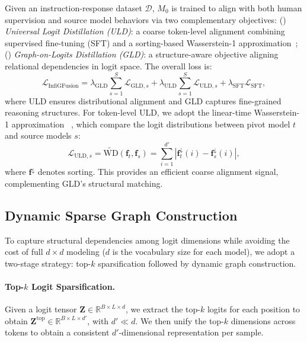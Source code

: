 \documentclass{article}
\begin{document}
Given an instruction-response dataset $\mathcal{D}$, $M_0$ is trained to align with both human supervision and source model behaviors via two complementary objectives:
() \textit{Universal Logit Distillation (ULD)}: a coarse token-level alignment combining supervised fine-tuning (SFT) and a sorting-based Wasserstein-1 approximation~\cite{boizardtowards};
() \textit{Graph-on-Logits Distillation (GLD)}: a structure-aware objective aligning relational dependencies in logit space. 
The overall loss is:
\begin{equation}
\mathcal{L}_{\text{InfiGFusion}} = \lambda_{\text{GLD}} \sum_{s=1}^{S} \mathcal{L}_{\text{GLD},s} + \lambda_{\text{ULD}} \sum_{s=1}^{S} \mathcal{L}_{\text{ULD},s} + \lambda_{\text{SFT}} \mathcal{L}_{\text{SFT}},
\end{equation}
where ULD ensures distributional alignment and GLD captures fine-grained reasoning structures.
For token-level ULD, we adopt the linear-time Wasserstein-1 approximation ~\cite{boizardtowards}, which compare the logit distributions between pivot model $t$ and source models $s$:
\begin{equation}
\mathcal{L}_{\text{ULD},s} = \widetilde{\text{WD}}(\mathbf{f}_t, \mathbf{f}_s) = \sum_{i=1}^{d'} \left| \mathbf{f}_t^{\downarrow}(i) - \mathbf{f}_s^{\downarrow}(i) \right|,
\end{equation}
where $\mathbf{f}^{\downarrow}$ denotes sorting. This provides an efficient coarse alignment signal, complementing GLD's structural matching.





\subsection{Dynamic Sparse Graph Construction}

To capture structural dependencies among logit dimensions while avoiding the cost of full $d \times d$ modeling ($d$ is the vocabulary size for each model), we adopt a two-stage strategy: top-$k$ sparsification followed by dynamic graph construction.

\paragraph{Top-$k$ Logit Sparsification.}
Given a logit tensor $\mathbf{Z} \in \mathbb{R}^{B \times L \times d}$, we extract the top-$k$ logits for each position to obtain $\mathbf{Z}^{\text{top}} \in \mathbb{R}^{B \times L \times d'}$, with $d' \ll d$. 
We then unify the top-$k$ dimensions across tokens to obtain a consistent $d'$-dimensional representation per sample.
\end{document}
